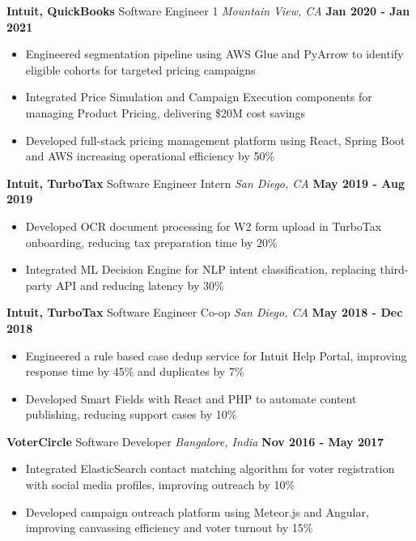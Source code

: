 \documentclass[10pt, letterpaper]{article}
\newcommand{\jobentry}[4]{
  \noindent\textbf{#1} \hfill #2 \hfill \textit{#3} \hfill \textbf{#4}
}
\begin{document}
\jobentry{Intuit, QuickBooks}{Software Engineer 1}{Mountain View, CA}{Jan 2020 - Jan 2021}
\begin{itemize}
	\item Engineered segmentation pipeline using AWS Glue and PyArrow to identify eligible cohorts for targeted pricing campaigns
	\item Integrated Price Simulation and Campaign Execution components for managing Product Pricing, delivering \$20M cost savings
	\item Developed full-stack pricing management platform using React, Spring Boot and AWS increasing operational efficiency by 50\%
\end{itemize}

\jobentry{Intuit, TurboTax}{Software Engineer Intern}{San Diego, CA}{May 2019 - Aug 2019}
\begin{itemize}
	\item Developed OCR document processing for W2 form upload in TurboTax onboarding, reducing tax preparation time by 20\%
	\item Integrated ML Decision Engine for NLP intent classification, replacing third-party API and reducing latency by 30\%
\end{itemize}

\jobentry{Intuit, TurboTax}{Software Engineer Co-op}{San Diego, CA}{May 2018 - Dec 2018}
\begin{itemize}
	\item Engineered a rule based case dedup service for Intuit Help Portal, improving response time by 45\% and duplicates by 7\%
	\item Developed Smart Fields with React and PHP to automate content publishing, reducing support cases by 10\%
\end{itemize}

\jobentry{VoterCircle}{Software Developer}{Bangalore, India}{Nov 2016 - May 2017}
\begin{itemize}
	\item Integrated ElasticSearch contact matching algorithm for voter registration with social media profiles, improving outreach by 10\%
	\item Developed campaign outreach platform using Meteor.js and Angular, improving canvassing efficiency and voter turnout by 15\%
\end{itemize}
\end{document}
